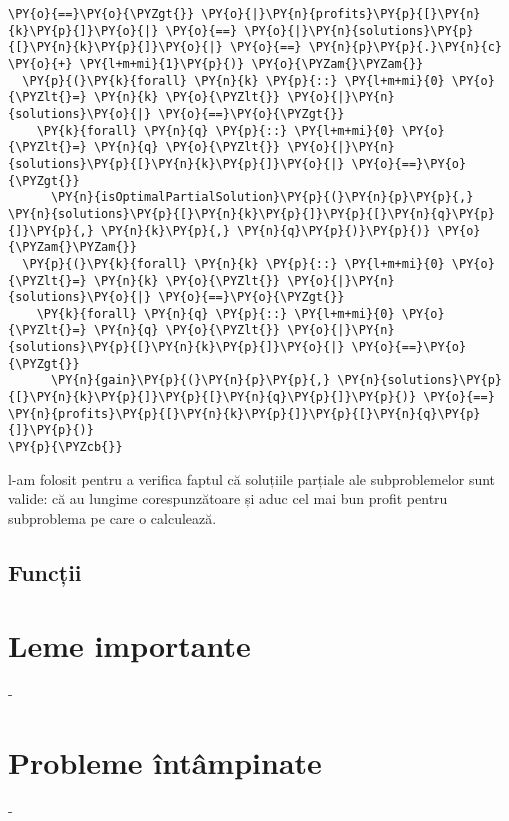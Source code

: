 \begin{enumerate}
\begin{Verbatim}[commandchars=\\\{\}]
  \PY{o}{==}\PY{o}{\PYZgt{}} \PY{o}{|}\PY{n}{profits}\PY{p}{[}\PY{n}{k}\PY{p}{]}\PY{o}{|} \PY{o}{==} \PY{o}{|}\PY{n}{solutions}\PY{p}{[}\PY{n}{k}\PY{p}{]}\PY{o}{|} \PY{o}{==} \PY{n}{p}\PY{p}{.}\PY{n}{c} \PY{o}{+} \PY{l+m+mi}{1}\PY{p}{)} \PY{o}{\PYZam{}\PYZam{}} 
  \PY{p}{(}\PY{k}{forall} \PY{n}{k} \PY{p}{::} \PY{l+m+mi}{0} \PY{o}{\PYZlt{}=} \PY{n}{k} \PY{o}{\PYZlt{}} \PY{o}{|}\PY{n}{solutions}\PY{o}{|} \PY{o}{==}\PY{o}{\PYZgt{}} 
    \PY{k}{forall} \PY{n}{q} \PY{p}{::} \PY{l+m+mi}{0} \PY{o}{\PYZlt{}=} \PY{n}{q} \PY{o}{\PYZlt{}} \PY{o}{|}\PY{n}{solutions}\PY{p}{[}\PY{n}{k}\PY{p}{]}\PY{o}{|} \PY{o}{==}\PY{o}{\PYZgt{}} 
      \PY{n}{isOptimalPartialSolution}\PY{p}{(}\PY{n}{p}\PY{p}{,} \PY{n}{solutions}\PY{p}{[}\PY{n}{k}\PY{p}{]}\PY{p}{[}\PY{n}{q}\PY{p}{]}\PY{p}{,} \PY{n}{k}\PY{p}{,} \PY{n}{q}\PY{p}{)}\PY{p}{)} \PY{o}{\PYZam{}\PYZam{}} 
  \PY{p}{(}\PY{k}{forall} \PY{n}{k} \PY{p}{::} \PY{l+m+mi}{0} \PY{o}{\PYZlt{}=} \PY{n}{k} \PY{o}{\PYZlt{}} \PY{o}{|}\PY{n}{solutions}\PY{o}{|} \PY{o}{==}\PY{o}{\PYZgt{}} 
    \PY{k}{forall} \PY{n}{q} \PY{p}{::} \PY{l+m+mi}{0} \PY{o}{\PYZlt{}=} \PY{n}{q} \PY{o}{\PYZlt{}} \PY{o}{|}\PY{n}{solutions}\PY{p}{[}\PY{n}{k}\PY{p}{]}\PY{o}{|} \PY{o}{==}\PY{o}{\PYZgt{}} 
      \PY{n}{gain}\PY{p}{(}\PY{n}{p}\PY{p}{,} \PY{n}{solutions}\PY{p}{[}\PY{n}{k}\PY{p}{]}\PY{p}{[}\PY{n}{q}\PY{p}{]}\PY{p}{)} \PY{o}{==} \PY{n}{profits}\PY{p}{[}\PY{n}{k}\PY{p}{]}\PY{p}{[}\PY{n}{q}\PY{p}{]}\PY{p}{)}
\PY{p}{\PYZcb{}}
\end{Verbatim}
    l-am folosit pentru a verifica faptul că soluțiile parțiale ale subproblemelor sunt valide: că au lungime corespunzătoare și aduc cel mai bun profit pentru subproblema pe care o calculează.
\end{enumerate}

\subsection{Funcții}


\section{Leme importante}

-

\section{Probleme întâmpinate}

-